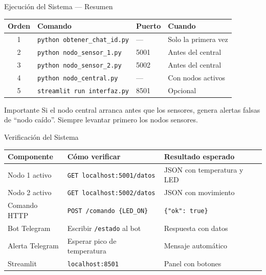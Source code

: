\documentclass[aspectratio=169]{beamer}
\begin{document}
\begin{frame}{Ejecuci\'on del Sistema --- Resumen}

\begin{center}
\begin{tabular}{clll}
\toprule
\textbf{Orden} & \textbf{Comando} & \textbf{Puerto} & \textbf{Cuando} \\
\midrule
1 & \texttt{python obtener\_chat\_id.py} & ---  & Solo la primera vez \\
2 & \texttt{python nodo\_sensor\_1.py}   & 5001 & Antes del central \\
3 & \texttt{python nodo\_sensor\_2.py}   & 5002 & Antes del central \\
4 & \texttt{python nodo\_central.py}     & ---  & Con nodos activos \\
5 & \texttt{streamlit run interfaz.py}   & 8501 & Opcional \\
\bottomrule
\end{tabular}
\end{center}

\vspace{0.5em}
\begin{alertblock}{Importante}
Si el nodo central arranca antes que los sensores, genera alertas falsas de
``nodo ca\'ido''. Siempre levantar primero los nodos sensores.
\end{alertblock}
\end{frame}

\begin{frame}{Verificaci\'on del Sistema}

\begin{center}
\begin{tabular}{lll}
\toprule
\textbf{Componente} & \textbf{C\'omo verificar} & \textbf{Resultado esperado} \\
\midrule
Nodo 1 activo     & \texttt{GET localhost:5001/datos}     & JSON con temperatura y LED \\
Nodo 2 activo     & \texttt{GET localhost:5002/datos}     & JSON con movimiento \\
Comando HTTP      & \texttt{POST /comando \{LED\_ON\}}   & \texttt{\{"ok": true\}} \\
Bot Telegram      & Escribir \texttt{/estado} al bot      & Respuesta con datos \\
Alerta Telegram   & Esperar pico de temperatura           & Mensaje autom\'atico \\
Streamlit         & \texttt{localhost:8501}               & Panel con botones \\
\bottomrule
\end{tabular}
\end{center}
\end{frame}
\end{document}
